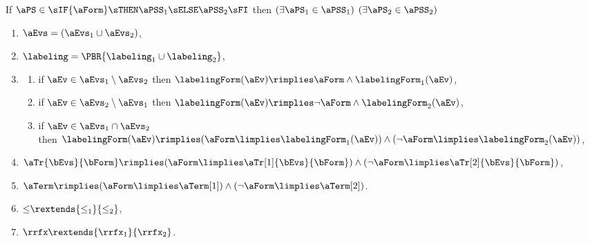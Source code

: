 \begin{definition}
  \noindent
  If $\aPS \in \sIF{\aForm}\sTHEN\aPSS_1\sELSE\aPSS_2\sFI$ then
  $(\exists\aPS_1\in\aPSS_1)$ $(\exists\aPS_2\in\aPSS_2)$
  \begin{multicols}{2}
    \begin{enumerate}[topsep=0pt,label=(\textsc{i}\arabic*),ref=\textsc{i}\arabic*]
    \item \label{if-E}
      $\aEvs = (\aEvs_1\cup\aEvs_2)$,
    \item \label{if-lambda}
      ${\labeling}=\PBR{{\labeling_1}\cup {\labeling_2}}$, 
    \item[] \label{par-kappa}
      \begin{enumerate}[leftmargin=0pt]
      \item \label{if-kappa1}
        if $\aEv\in\aEvs_1\setminus\aEvs_2$ then $\labelingForm(\aEv) \rimplies \aForm\land\labelingForm_1(\aEv)$,
      \item \label{if-kappa2}
        if $\aEv\in\aEvs_2\setminus\aEvs_1$ then $\labelingForm(\aEv) \rimplies \neg\aForm\land\labelingForm_2(\aEv)$, 
      \item \label{if-kappa12}
        if $\aEv\in\aEvs_1\cap\aEvs_2$\\ then
        $\labelingForm(\aEv) \rimplies (\aForm\limplies\labelingForm_1(\aEv))\land(\neg\aForm\limplies\labelingForm_2(\aEv))$,
      \end{enumerate}
    \item \label{if-tau}
      $\aTr{\bEvs}{\bForm} \rimplies
      (\aForm\limplies\aTr[1]{\bEvs}{\bForm})\land(\neg\aForm\limplies\aTr[2]{\bEvs}{\bForm})$,
    \item \label{if-term}
      $\aTerm \rimplies (\aForm\limplies\aTerm[1])\land(\neg\aForm\limplies\aTerm[2])$.
    \item \label{if-le-extends}
      ${\le}\rextends{\le_1}{\le_2}$, 
    \item \label{if-rf-extends}
      ${\rrfx}\rextends{\rrfx_1}{\rrfx_2}$.
    \end{enumerate}
  \end{multicols}


\end{definition}
